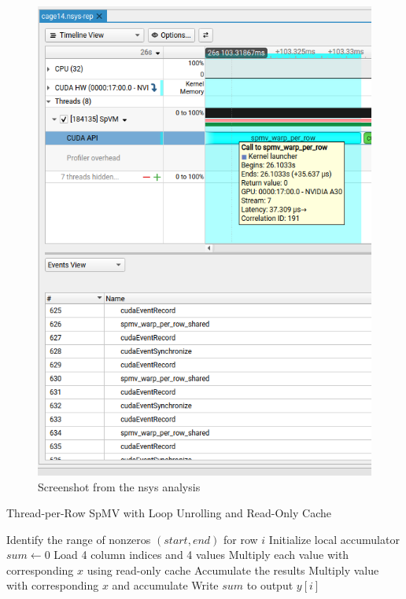 \documentclass[conference]{IEEEtran}
\begin{document}
\begin{figure}[ht]
    \centering
    \includegraphics[width=0.95\linewidth]{nsys.png}
    \caption{Screenshot from the nsys analysis}
    \label{fig:spvmexample}
\end{figure}

\begin{algorithm*}[ht]
    \caption{Thread-per-Row SpMV with Loop Unrolling and Read-Only Cache}
    \label{tpr_opt}
    \begin{algorithmic}[1]
            \State Identify the range of nonzeros $(start, end)$ for row $i$
            \State Initialize local accumulator $sum \gets 0$
                \State Load 4 column indices and 4 values
                \State Multiply each value with corresponding $x$ using read-only cache
                \State Accumulate the results
            \EndFor
                \State Multiply value with corresponding $x$ and accumulate
            \EndFor
            \State Write $sum$ to output $y[i]$
        \EndFor
    \EndProcedure
    \end{algorithmic}
\end{algorithm*}
\end{document}
